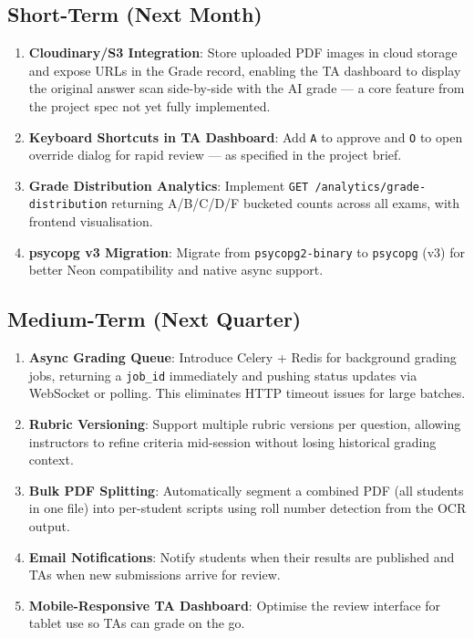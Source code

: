 \documentclass[12pt,a4paper]{article}
\begin{document}
\subsection{Short-Term (Next Month)}

\begin{enumerate}[leftmargin=*, noitemsep]
  \item \textbf{Cloudinary/S3 Integration}: Store uploaded PDF images in cloud storage and expose URLs in the Grade record, enabling the TA dashboard to display the original answer scan side-by-side with the AI grade — a core feature from the project spec not yet fully implemented.
  \item \textbf{Keyboard Shortcuts in TA Dashboard}: Add \texttt{A} to approve and \texttt{O} to open override dialog for rapid review — as specified in the project brief.
  \item \textbf{Grade Distribution Analytics}: Implement \texttt{GET /analytics/grade-distribution} returning A/B/C/D/F bucketed counts across all exams, with frontend visualisation.
  \item \textbf{psycopg v3 Migration}: Migrate from \texttt{psycopg2-binary} to \texttt{psycopg} (v3) for better Neon compatibility and native async support.
\end{enumerate}

\subsection{Medium-Term (Next Quarter)}

\begin{enumerate}[leftmargin=*, noitemsep]
  \item \textbf{Async Grading Queue}: Introduce Celery + Redis for background grading jobs, returning a \texttt{job\_id} immediately and pushing status updates via WebSocket or polling. This eliminates HTTP timeout issues for large batches.
  \item \textbf{Rubric Versioning}: Support multiple rubric versions per question, allowing instructors to refine criteria mid-session without losing historical grading context.
  \item \textbf{Bulk PDF Splitting}: Automatically segment a combined PDF (all students in one file) into per-student scripts using roll number detection from the OCR output.
  \item \textbf{Email Notifications}: Notify students when their results are published and TAs when new submissions arrive for review.
  \item \textbf{Mobile-Responsive TA Dashboard}: Optimise the review interface for tablet use so TAs can grade on the go.
\end{enumerate}
\end{document}

